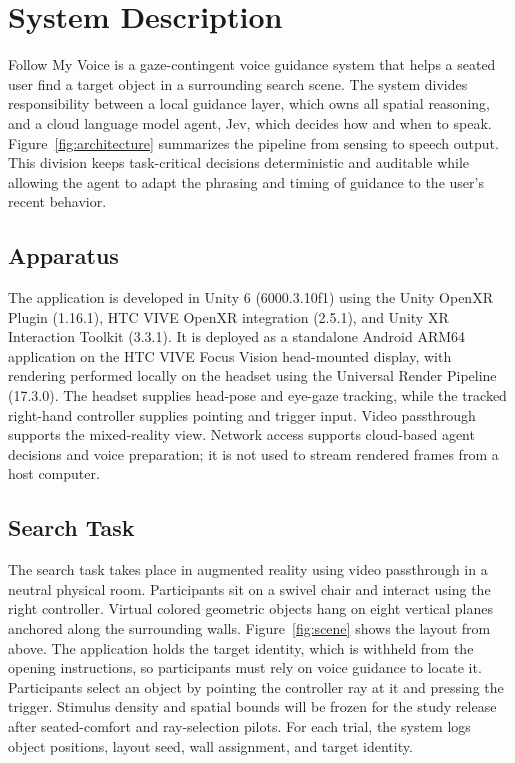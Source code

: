 \documentclass[11pt,letterpaper]{article}
\begin{document}
\setcounter{section}{2}
\section{System Description}
Follow My Voice is a gaze-contingent voice guidance system that helps a seated user find a target object in a surrounding search scene. The system divides responsibility between a local guidance layer, which owns all spatial reasoning, and a cloud language model agent, Jev, which decides how and when to speak. Figure~\ref{fig:architecture} summarizes the pipeline from sensing to speech output. This division keeps task-critical decisions deterministic and auditable while allowing the agent to adapt the phrasing and timing of guidance to the user's recent behavior.

\subsection{Apparatus}
The application is developed in Unity 6 (6000.3.10f1) using the Unity OpenXR Plugin (1.16.1), HTC VIVE OpenXR integration (2.5.1), and Unity XR Interaction Toolkit (3.3.1). It is deployed as a standalone Android ARM64 application on the HTC VIVE Focus Vision head-mounted display, with rendering performed locally on the headset using the Universal Render Pipeline (17.3.0). The headset supplies head-pose and eye-gaze tracking, while the tracked right-hand controller supplies pointing and trigger input. Video passthrough supports the mixed-reality view. Network access supports cloud-based agent decisions and voice preparation; it is not used to stream rendered frames from a host computer.

\subsection{Search Task}
The search task takes place in augmented reality using video passthrough in a neutral physical room. Participants sit on a swivel chair and interact using the right controller. Virtual colored geometric objects hang on eight vertical planes anchored along the surrounding walls. Figure~\ref{fig:scene} shows the layout from above. The application holds the target identity, which is withheld from the opening instructions, so participants must rely on voice guidance to locate it. Participants select an object by pointing the controller ray at it and pressing the trigger. Stimulus density and spatial bounds will be frozen for the study release after seated-comfort and ray-selection pilots. For each trial, the system logs object positions, layout seed, wall assignment, and target identity.
\end{document}
